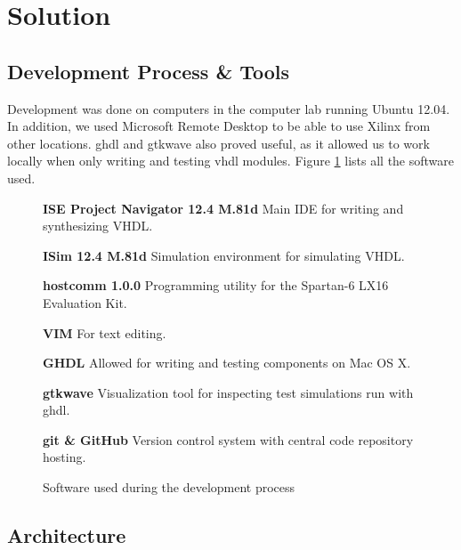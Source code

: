 \section{Solution}


\subsection{Development Process \& Tools}

Development was done on computers in the computer lab running Ubuntu 12.04.
In addition, we used Microsoft Remote Desktop to be able to use Xilinx from other locations.
ghdl and gtkwave also proved useful, as it allowed us to work locally when only writing and testing vhdl modules. Figure \ref{fig:software} lists all the software used.

\begin{figure}[ht!]
    \begin{description}
        \item{\textbf{ISE Project Navigator 12.4 M.81d}}
            Main IDE for writing and synthesizing VHDL.
        \item{\textbf{ISim 12.4 M.81d}}
            Simulation environment for simulating VHDL.
        \item{\textbf{hostcomm 1.0.0}}
            Programming utility for the Spartan-6 LX16 Evaluation Kit.
        \item{\textbf{VIM}}
            For text editing.
        \item{\textbf{GHDL}}
            Allowed for writing and testing components on Mac OS X.
        \item{\textbf{gtkwave}}
            Visualization tool for inspecting test simulations run with ghdl.
        \item{\textbf{git \& GitHub}}
            Version control system with central code repository hosting.
    \label{fig:software}
    \end{description}
    \caption{Software used during the development process}
\end{figure}

\subsection{Architecture}


